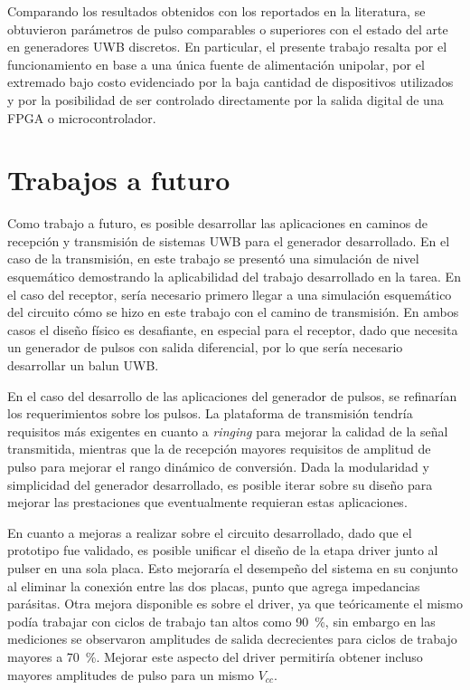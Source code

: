 Comparando los resultados obtenidos con los reportados en la literatura, se
obtuvieron parámetros de pulso comparables o superiores con el estado del arte
en generadores UWB discretos. En particular, el presente trabajo resalta por el
funcionamiento en base a una única fuente de alimentación unipolar, por el
extremado bajo costo evidenciado por la baja cantidad de dispositivos utilizados
y por la posibilidad de ser controlado directamente por la salida digital de una
FPGA o microcontrolador.

\section{Trabajos a futuro}

Como trabajo a futuro, es posible desarrollar las aplicaciones en caminos de
recepción y transmisión de sistemas UWB para el generador desarrollado. En el
caso de la transmisión, en este trabajo se presentó una simulación de nivel
esquemático demostrando la aplicabilidad del trabajo desarrollado en la tarea.
En el caso del receptor, sería necesario primero llegar a una simulación
esquemático del circuito cómo se hizo en este trabajo con el camino de
transmisión. En ambos casos el diseño físico es desafiante, en especial para el
receptor, dado que necesita un generador de pulsos con salida diferencial, por
lo que sería necesario desarrollar un balun UWB.

En el caso del desarrollo de las aplicaciones del generador de pulsos, se
refinarían los requerimientos sobre los pulsos. La plataforma de transmisión
tendría requisitos más exigentes en cuanto a \textit{ringing} para mejorar la
calidad de la señal transmitida, mientras que la de recepción
mayores requisitos de amplitud de pulso para mejorar el rango dinámico de
conversión. Dada la modularidad y simplicidad del generador desarrollado, es
posible iterar sobre su diseño para mejorar las prestaciones que eventualmente
requieran estas aplicaciones.

En cuanto a mejoras a realizar sobre el circuito desarrollado, dado que el
prototipo fue validado, es posible unificar el diseño de la etapa driver
junto al pulser en una sola placa. Esto mejoraría el desempeño del sistema en su
conjunto al eliminar la conexión entre las dos placas, punto que agrega
impedancias parásitas. Otra mejora disponible es sobre el driver, ya que
teóricamente el mismo podía trabajar con ciclos de trabajo tan altos como
\qty{90}{\percent}, sin embargo en las mediciones se observaron amplitudes de
salida decrecientes para ciclos de trabajo mayores a \qty{70}{\percent}. Mejorar
este aspecto del driver permitiría obtener incluso mayores amplitudes de pulso
para un mismo $V_{cc}$.


